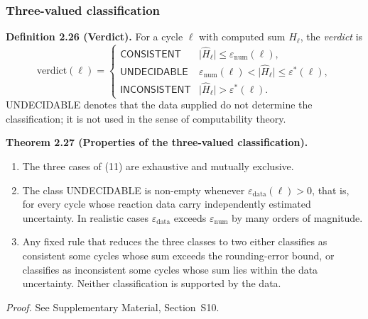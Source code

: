 \documentclass[11pt,a4paper]{article}
\theoremstyle{pstyle}
\theoremstyle{definition}
\theoremstyle{remark}
\newcommand{\abs}[1]{\lvert#1\rvert}
\newcommand{\eps}{\varepsilon}
\newcommand{\epsnum}{\eps_{\mathrm{num}}}
\newcommand{\epsdata}{\eps_{\mathrm{data}}}
\newcommand{\epsstar}{\eps^{\ast}}
\newcommand{\hol}{H}
\begin{document}
\subsubsection{Three-valued classification}

\par\noindent\textbf{Definition 2.26 (Verdict).}\label{def:verdict} 
For a cycle $\ell$ with computed sum $\widehat{\hol}_\ell$, the
\emph{verdict} is
\begin{equation}
  \mathrm{verdict}(\ell) =
  \begin{cases}
    \textsf{CONSISTENT}   & \abs{\widehat{\hol}_\ell} \le
                            \epsnum(\ell),\\[2pt]
    \textsf{UNDECIDABLE}  & \epsnum(\ell) < \abs{\widehat{\hol}_\ell}
                            \le \epsstar(\ell),\\[2pt]
    \textsf{INCONSISTENT} & \abs{\widehat{\hol}_\ell} > \epsstar(\ell).
  \end{cases}
  \label{eq:verdict}
\end{equation}
\textsf{UNDECIDABLE} denotes that the data supplied do not determine the
classification; it is not used in the sense of computability theory.
\par

\par\noindent\textbf{Theorem 2.27 (Properties of the three-valued classification).}\label{thm:trichotomy} 
\leavevmode
\begin{enumerate}[label=(\roman*),leftmargin=2em,itemsep=2pt]
\item The three cases of (11) are exhaustive and mutually
exclusive.
\item The class \textsf{UNDECIDABLE} is non-empty whenever
$\epsdata(\ell) > 0$, that is, for every cycle whose reaction data carry
independently estimated uncertainty. In realistic cases $\epsdata$
exceeds $\epsnum$ by many orders of magnitude.
\item Any fixed rule that reduces the three classes to two either
classifies as consistent some cycles whose sum exceeds the rounding-error
bound, or classifies as inconsistent some cycles whose sum lies within
the data uncertainty. Neither classification is supported by the data.
\end{enumerate}
\par

\noindent\emph{Proof.} See Supplementary Material, Section~S10.
\end{document}

